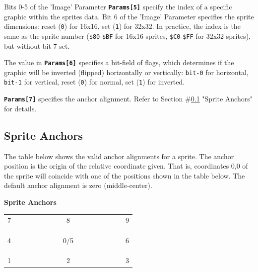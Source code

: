 \documentclass[12pt]{article}
\newcommand{\MonoSp}[1] {\fontsize{10pt}{10pt}\selectfont\texttt{#1}\normalsize}
\newcommand{\Param}[1] {\textbf{\texttt{Params[#1]}}}
\begin{document}
Bits 0-5 of the 'Image' Parameter \Param{5} specify
the index of a specific graphic within the sprites data.
Bit 6 of the 'Image' Parameter specifies the sprite dimensions:
reset (\MonoSp{0}) for 16x16, set (\MonoSp{1}) for 32x32.
In practice, the index is the same as the sprite number
(\MonoSp{\$80}-\MonoSp{\$BF} for 16x16 sprites,
\MonoSp{\$C0}-\MonoSp{\$FF} for 32x32 sprites), but without bit-7 set.
\newline

The value in \Param{6} specifies a bit-field of flags,
which determines if the graphic will be inverted (flipped) horizontally or vertically:
\MonoSp{bit-0} for horizontal, \MonoSp{bit-1} for vertical,
reset (\MonoSp{0}) for normal, set (\MonoSp{1}) for inverted.
\newline

\Param{7} specifies the anchor alignment.
Refer to Section \#\ref{subsec:sprite-anchors} "Sprite Anchors" for details.
\newline


\pagebreak


\subsection{Sprite Anchors}\label{subsec:sprite-anchors}

The table below shows the valid anchor alignments for a sprite.
The anchor position is the origin of the relative coordinate given.
That is, coordinates 0,0 of the sprite
will coincide with one of the positions shown in the table below.
The default anchor alignment is zero (middle-center).

\begin{table}[h]
\centering\textbf{Sprite Anchors} \\
\begin{tabular}{| l | c | r | }      \hline
7~~~~~~~~~&~~~~~8~~~~~&~~~~~~~~~9 \\
          &           &           \\
          &           &           \\ \hline
          &           &           \\
4         &    0/5    &         6 \\
          &           &           \\ \hline
          &           &           \\
          &           &           \\
1         &     2     &         3 \\
\hline
\end{tabular}
\end{table}
\end{document}
